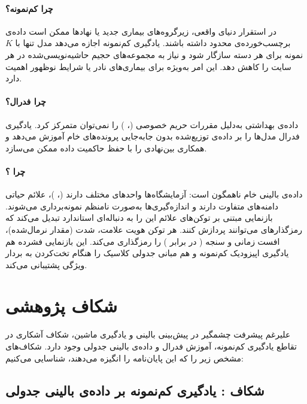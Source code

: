 \paragraph{چرا کم‌نمونه؟} در استقرار دنیای واقعی، زیرگروه‌های بیماری جدید یا نهادها ممکن است داده‌ی برچسب‌خورده‌ی محدود داشته باشند. یادگیری کم‌نمونه اجازه می‌دهد مدل تنها با $K$ نمونه برای هر دسته سازگار شود و نیاز به مجموعه‌های حجیم حاشیه‌نویسی‌شده در هر سایت را کاهش دهد. این امر به‌ویژه برای بیماری‌های نادر یا شرایط نوظهور اهمیت دارد.

\paragraph{چرا فدرال؟} داده‌ی بهداشتی به‌دلیل مقررات حریم خصوصی (، ) را نمی‌توان متمرکز کرد. یادگیری فدرال مدل‌ها را بر داده‌ی توزیع‌شده بدون جابه‌جایی پرونده‌های خام آموزش می‌دهد و همکاری بین‌نهادی را با حفظ حاکمیت داده ممکن می‌سازد.

\paragraph{چرا ؟} داده‌ی بالینی خام ناهمگون است: آزمایشگاه‌ها واحدهای مختلف دارند (، )، علائم حیاتی دامنه‌های متفاوت دارند و اندازه‌گیری‌ها به‌صورت نامنظم نمونه‌برداری می‌شوند. بازنمایی مبتنی بر توکن‌های علائم این را به دنباله‌ای استاندارد تبدیل می‌کند که رمزگذارهای  می‌توانند پردازش کنند. هر توکن هویت علامت، شدت (مقدار نرمال‌شده)، افست زمانی و سنجه ( در برابر ) را رمزگذاری می‌کند. این بازنمایی فشرده هم یادگیری اپیزودیک کم‌نمونه و هم مبانی جدولی کلاسیک را هنگام تخت‌کردن به بردار ویژگی پشتیبانی می‌کند.

\section{شکاف پژوهشی}

علیرغم پیشرفت چشمگیر در پیش‌بینی بالینی و یادگیری ماشین، شکاف آشکاری در تقاطع یادگیری کم‌نمونه، آموزش فدرال و داده‌ی بالینی جدولی وجود دارد. شکاف‌های مشخص زیر را که این پایان‌نامه را انگیزه می‌دهند، شناسایی می‌کنیم:

\subsection{شکاف : یادگیری کم‌نمونه بر داده‌ی بالینی جدولی}

